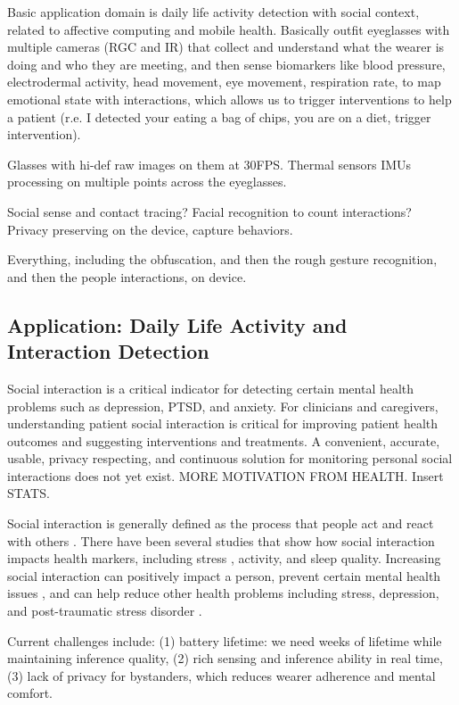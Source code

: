 Basic application domain is daily life activity detection with social context, related to affective computing and mobile health. Basically outfit eyeglasses with multiple cameras (RGC and IR) that collect and understand what the wearer is doing and who they are meeting, and then sense biomarkers like blood pressure, electrodermal activity, head movement, eye movement, respiration rate, to map emotional state with interactions, which allows us to trigger interventions to help a patient (r.e. I detected your eating a bag of chips, you are on a diet, trigger intervention).

Glasses with hi-def raw images on them at 30FPS.
Thermal sensors
IMUs processing on multiple points across the eyeglasses.

Social sense and contact tracing? Facial recognition to count interactions? Privacy preserving on the device, capture behaviors.

Everything, including the obfuscation, and then the rough gesture recognition, and then the people interactions, on device.


\subsection{Application: Daily Life Activity and Interaction Detection}
Social interaction is a critical indicator for detecting certain mental health problems such as depression, PTSD, and anxiety. 
For clinicians and caregivers, understanding patient social interaction is critical for improving patient health outcomes and suggesting interventions and treatments. 
A convenient, accurate, usable, privacy respecting, and continuous solution for monitoring personal social interactions does not yet exist. MORE MOTIVATION FROM HEALTH. Insert STATS.

Social interaction is generally defined as the process that people act and react with others \cite{goffman1978presentation}. There have been several studies that show how social interaction impacts health markers, including stress \cite{ono2011relationship}, activity, and sleep quality. 
Increasing social interaction can positively impact a person, prevent certain mental health issues \cite{godart2000anxiety}, and can help reduce other health problems including stress, depression, and post-traumatic stress disorder \cite{vesnaver2011social}.

Current challenges include: (1) battery lifetime: we need weeks of lifetime while maintaining inference quality, (2) rich sensing and inference ability in real time, (3) lack of privacy for bystanders, which reduces wearer adherence and mental comfort.

